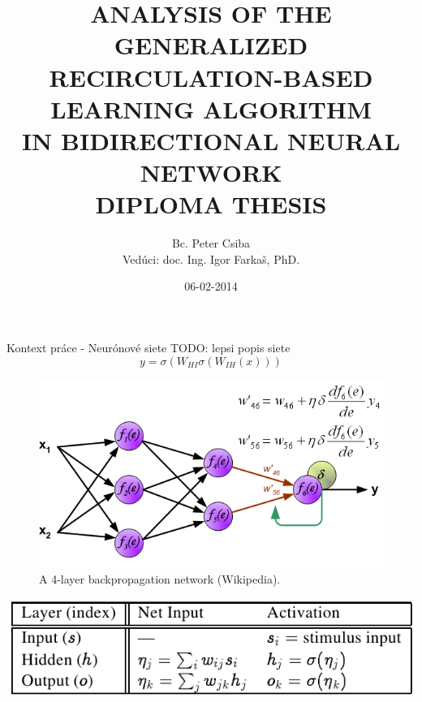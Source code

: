 \documentclass[xcolor=dvipsnames]{beamer}
\title[ANALYSIS OF A LEARNING ALGORITHM IN BIDIRECTIONAL NEURAL NETWORK]{
ANALYSIS OF THE GENERALIZED \\
RECIRCULATION-BASED LEARNING ALGORITHM \\
IN BIDIRECTIONAL NEURAL NETWORK \\
\vspace{3cm}
DIPLOMA THESIS
}
\author[P. Csiba]{Bc. Peter Csiba \\ Vedúci: doc. Ing. Igor Farkaš, PhD.}
\institute[FMFI UK]{
  UNIVERZITA KOMENSKÉHO V BRATISLAVE\\
  FAKULTA MATEMATIKY, FYZIKY A INFORMATIKY
}
\date{06-02-2014}
\begin{document}
\begin{frame}[plain]
  \titlepage
\end{frame}



\begin{frame}{Kontext práce - Neurónové siete}
  TODO: lepsi popis siete
  $$y = \sigma(W_{HI} \sigma(W_{IH}(x)))$$ 

  \begin{figure}[h!]
    \centering
    \includegraphics[scale=0.4]{img/bp.png}
    \vspace{-5pt} 
    \caption{{\tiny A 4-layer backpropagation network (Wikipedia).}}
  \end{figure}
  
  \begin{center} 
    \vspace{-5pt} 
    \includegraphics[scale=0.4]{img/table_bp.png}
  \end{center} 
\end{frame}
\end{document}
